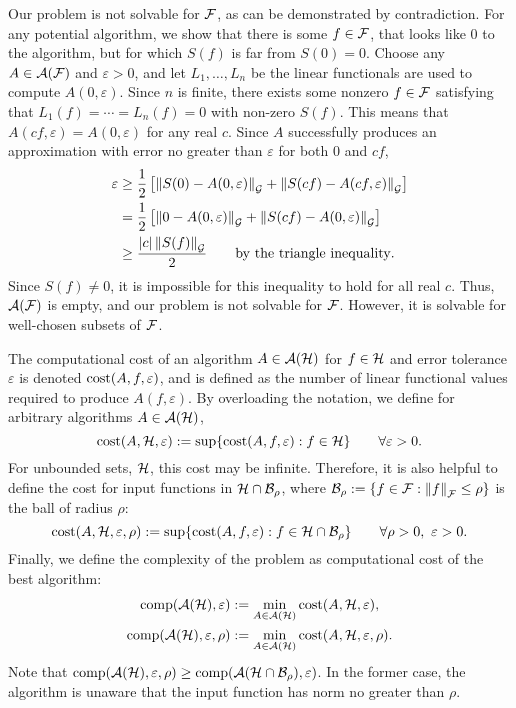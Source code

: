 \documentclass[final]{elsarticle}
\theoremstyle{definition}
\theoremstyle{remark}
\begin{document}
Our problem is not solvable for $\cf$, as can be demonstrated by contradiction. For any potential algorithm, we show that there is some $f \in \cf$, that looks like $0$ to the algorithm, but for which $S(f)$ is far from $S(0) = 0$.   Choose any $A \in \ca(\cf)$ and $\varepsilon > 0$, and let $L_1, \ldots, L_n$ be the linear functionals are used to compute $A(0,\varepsilon)$. Since $n$ is finite, there exists some nonzero $f \in \cf$ satisfying that $L_1(f) = \cdots = L_n(f) = 0$ with non-zero $S(f)$. This means that $A(cf,\varepsilon) = A(0,\varepsilon)$ for any real $c$.  Since $A$ successfully produces an approximation with error no greater than $\varepsilon$ for both $0$ and $cf$,
\begin{align*}
    \varepsilon &\ge \frac 12 \left[ \norm[\cg]{S(0) - A(0,\varepsilon)} + \norm[\cg]{S(cf) - A(cf,\varepsilon)}\right] \\
    & =  \frac 12 \left[ \norm[\cg]{0 - A(0,\varepsilon)} + \norm[\cg]{S(cf) - A(0,\varepsilon)}\right] \\
    & \ge  \frac {\abs{c}\norm[\cg]{S(f)}}2  \qquad \text{by the triangle inequality}.
\end{align*}
Since $S(f) \ne 0$, it is impossible for this inequality to hold for all real $c$.  Thus, $\ca(\cf)$ is empty, and our problem is not solvable for $\cf$.  However, it is solvable for well-chosen subsets of $\cf$.

The computational cost of an algorithm $A \in \ca(\ch)$ for $f \in \ch$ and error tolerance $\varepsilon$ is denoted $\cost(A,f,\varepsilon)$, and is defined as the number of linear functional values required to produce $A(f,\varepsilon)$.  By overloading the notation, we define for arbitrary algorithms $A \in \ca(\ch)$, 
\begin{equation*}
\cost(A,\ch,\varepsilon) : = \sup \{\cost(A,f,\varepsilon) : f \in \ch \} \qquad \forall \varepsilon > 0.
\end{equation*}
For unbounded sets, $\ch$, this cost may be infinite.  Therefore, it is also helpful to define the cost for input functions in $\ch \cap \cb_{\rho}$, where $\cb_{\rho} : = \{ f \in \cf : \norm[\cf]{f} \le \rho \}$ is the ball of radius $\rho$:
\begin{equation*}
\cost(A,\ch,\varepsilon,\rho) : = \sup \{\cost(A,f,\varepsilon) : f \in \ch \cap \cb_{\rho} \} \qquad \forall \rho > 0, \ \varepsilon > 0.
\end{equation*}
Finally, we define the complexity of the problem as computational cost of the best algorithm:
\begin{gather*}
\comp(\ca(\ch),\varepsilon) := \min_{A \in \ca(\ch)} \cost(A, \ch, \varepsilon), \\
\comp(\ca(\ch),\varepsilon,\rho) := \min_{A \in \ca(\ch)} \cost(A, \ch, \varepsilon, \rho).
\end{gather*}
Note that $\comp(\ca(\ch),\varepsilon,\rho) \ge \comp(\ca(\ch \cap \cb_{\rho}),\varepsilon)$.  In the former case, the algorithm is unaware  that the input function has norm no greater than $\rho$.  
\end{document}
